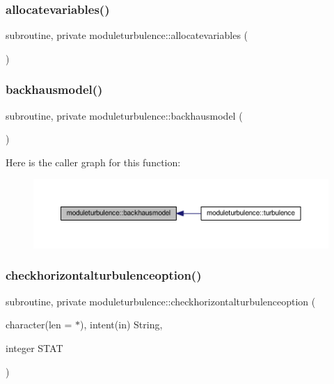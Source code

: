 \subsubsection{\texorpdfstring{allocatevariables()}{allocatevariables()}}
{\footnotesize\ttfamily subroutine, private moduleturbulence\+::allocatevariables (\begin{DoxyParamCaption}{ }\end{DoxyParamCaption})\hspace{0.3cm}{\ttfamily [private]}}

\mbox{\label{namespacemoduleturbulence_a823fa2230f79873d97eb37068c46756f}} 
\subsubsection{\texorpdfstring{backhausmodel()}{backhausmodel()}}
{\footnotesize\ttfamily subroutine, private moduleturbulence\+::backhausmodel (\begin{DoxyParamCaption}{ }\end{DoxyParamCaption})\hspace{0.3cm}{\ttfamily [private]}}

Here is the caller graph for this function\+:\nopagebreak
\begin{figure}[H]
\begin{center}
\leavevmode
\includegraphics[width=350pt]{namespacemoduleturbulence_a823fa2230f79873d97eb37068c46756f_icgraph}
\end{center}
\end{figure}
\mbox{\label{namespacemoduleturbulence_a2df9458a1ab29d4f5f3fd747ded725b4}} 
\subsubsection{\texorpdfstring{checkhorizontalturbulenceoption()}{checkhorizontalturbulenceoption()}}
{\footnotesize\ttfamily subroutine, private moduleturbulence\+::checkhorizontalturbulenceoption (\begin{DoxyParamCaption}\item[{character(len = $\ast$), intent(in)}]{String,  }\item[{integer}]{S\+T\+AT }\end{DoxyParamCaption})\hspace{0.3cm}{\ttfamily [private]}}

